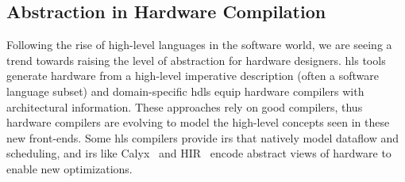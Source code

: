 \documentclass[acmsmall,screen,review]{acmart}
\begin{document}
\subsection{Abstraction in Hardware Compilation}
Following the rise of high-level languages in the software world, we are seeing a trend towards raising the level of abstraction for hardware designers.
\ac{hls} tools~\cite{cong2022hls} generate hardware from a high-level imperative description (often a software language subset) and domain-specific \acp{hdl} equip hardware compilers with architectural information.
These approaches rely on good compilers, thus hardware compilers are evolving to model the high-level concepts seen in these new front-ends.
Some \ac{hls} compilers provide \acp{ir} that natively model dataflow and scheduling, and \acp{ir} like Calyx~\cite{calyx} and HIR~\cite{majumder2021hir} encode abstract views of hardware to enable new optimizations.
\end{document}
